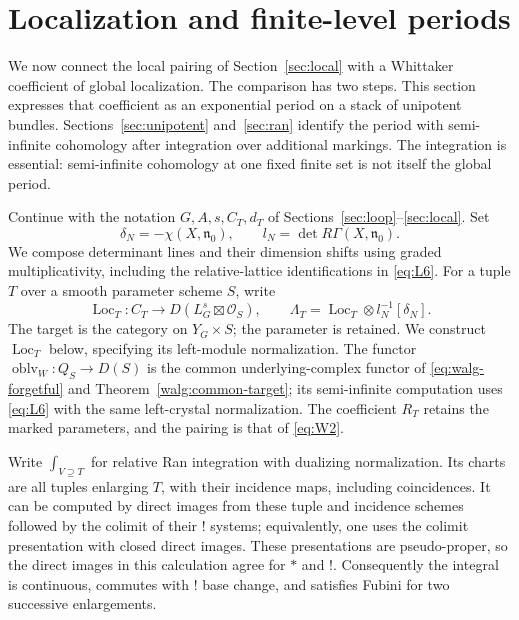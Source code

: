 \documentclass[11pt]{article}
\numberwithin{equation}{section}
\theoremstyle{definition}
\theoremstyle{remark}
\begin{document}
\section{Localization and finite-level periods}\label{sec:localization}

We now connect the local pairing of Section~\ref{sec:local} with a
Whittaker coefficient of global localization.  The comparison has two
steps.  This section expresses that coefficient as an exponential period
on a stack of unipotent bundles.  Sections~\ref{sec:unipotent}
and~\ref{sec:ran} identify the period with semi-infinite cohomology after
integration over additional markings.  The integration is essential:
semi-infinite cohomology at one fixed finite set is not itself the global
period.

Continue with the notation $G,A,s,C_T,d_T$ of
Sections~\ref{sec:loop}--\ref{sec:local}.  Set
\[
 \delta_N=-\chi(X,\mathfrak n_0),\qquad
 l_N=\det R\Gamma(X,\mathfrak n_0).
\]
We compose determinant lines and their dimension shifts using graded
multiplicativity, including the relative-lattice identifications in
\eqref{eq:L6}.  For a tuple $T$ over a smooth parameter scheme $S$, write
\[
 \operatorname{Loc}_T:C_T\longrightarrow
       D(L_G^s\boxtimes\mathcal O_S),\qquad
 \Lambda_T=\operatorname{Loc}_T\otimes l_N^{-1}[\delta_N].
\]
The target is the category on $Y_G\times S$; the parameter is retained.
We construct $\operatorname{Loc}_T$ below, specifying its left-module
normalization.  The functor $\operatorname{oblv}_W:Q_S\to D(S)$ is the
common underlying-complex functor of \eqref{eq:walg-forgetful} and
Theorem~\ref{walg:common-target};
its semi-infinite computation uses \eqref{eq:L6} with the same
left-crystal normalization.  The coefficient $R_T$ retains the marked
parameters, and the pairing is that of \eqref{eq:W2}.

Write $\int_{V\supseteq T}$ for relative Ran integration with dualizing
normalization.  Its charts are all tuples enlarging $T$, with their
incidence maps, including coincidences.  It can be computed by direct
images from these tuple and incidence schemes followed by the colimit
of their $!$ systems; equivalently, one uses the colimit presentation
with closed direct images.  These presentations are pseudo-proper,
so the direct images in this calculation agree for $*$ and $!$.
Consequently the integral is continuous, commutes with $!$ base change,
and satisfies Fubini for two successive enlargements.
\end{document}
